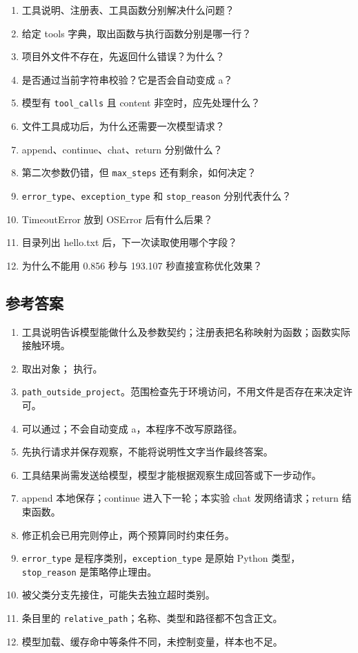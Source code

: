 \begin{enumerate}
\item 工具说明、注册表、工具函数分别解决什么问题？
\item 给定 tools 字典，取出函数与执行函数分别是哪一行？
\item 项目外文件不存在，先返回什么错误？为什么？
\item {} 是否通过当前字符串校验？它是否会自动变成 a？
\item 模型有 \nolinkurl{tool_calls} 且 content 非空时，应先处理什么？
\item 文件工具成功后，为什么还需要一次模型请求？
\item append、continue、chat、return 分别做什么？
\item 第二次参数仍错，但 \nolinkurl{max_steps} 还有剩余，如何决定？
\item \nolinkurl{error_type}、\nolinkurl{exception_type} 和 \nolinkurl{stop_reason} 分别代表什么？
\item TimeoutError 放到 OSError 后有什么后果？
\item 目录列出 hello.txt 后，下一次读取使用哪个字段？
\item 为什么不能用 0.856 秒与 193.107 秒直接宣称优化效果？
\end{enumerate}

\subsection{参考答案}

\begin{enumerate}
\item 工具说明告诉模型能做什么及参数契约；注册表把名称映射为函数；函数实际接触环境。
\item {} 取出对象； 执行。
\item \nolinkurl{path_outside_project}。范围检查先于环境访问，不用文件是否存在来决定许可。
\item 可以通过；不会自动变成 a，本程序不改写原路径。
\item 先执行请求并保存观察，不能将说明性文字当作最终答案。
\item 工具结果尚需发送给模型，模型才能根据观察生成回答或下一步动作。
\item append 本地保存；continue 进入下一轮；本实验 chat 发网络请求；return 结束函数。
\item 修正机会已用完则停止，两个预算同时约束任务。
\item \nolinkurl{error_type} 是程序类别，\nolinkurl{exception_type} 是原始 Python 类型，\nolinkurl{stop_reason} 是策略停止理由。
\item 被父类分支先接住，可能失去独立超时类别。
\item 条目里的 \nolinkurl{relative_path}；名称、类型和路径都不包含正文。
\item 模型加载、缓存命中等条件不同，未控制变量，样本也不足。
\end{enumerate}

